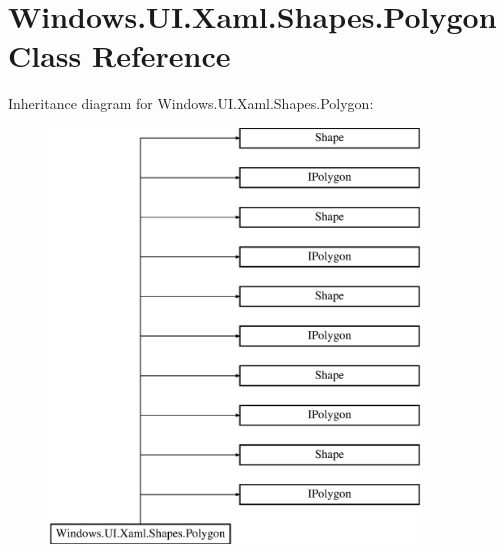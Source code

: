 \hypertarget{class_windows_1_1_u_i_1_1_xaml_1_1_shapes_1_1_polygon}{}\section{Windows.\+U\+I.\+Xaml.\+Shapes.\+Polygon Class Reference}
\label{class_windows_1_1_u_i_1_1_xaml_1_1_shapes_1_1_polygon}
Inheritance diagram for Windows.\+U\+I.\+Xaml.\+Shapes.\+Polygon\+:\begin{figure}[H]
\begin{center}
\leavevmode
\includegraphics[height=11.000000cm]{class_windows_1_1_u_i_1_1_xaml_1_1_shapes_1_1_polygon}
\end{center}
\end{figure}

